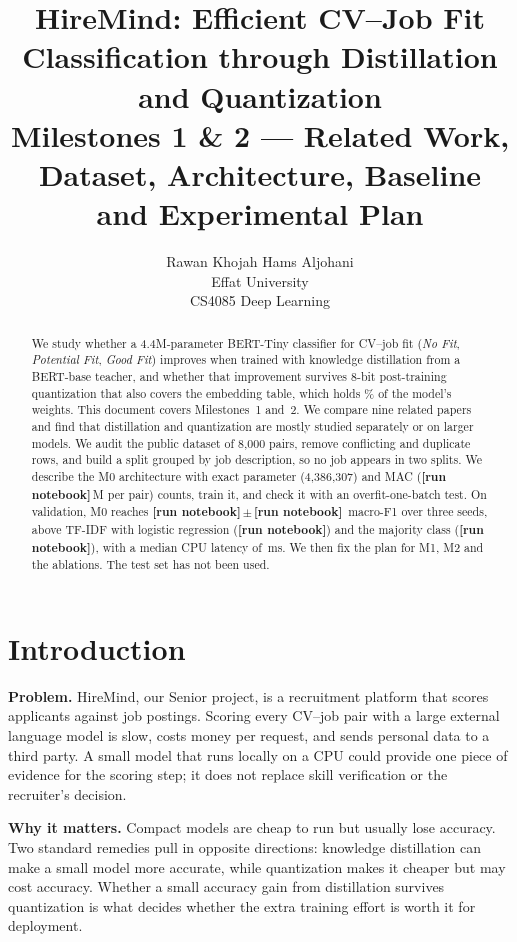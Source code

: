 \documentclass[11pt]{article}
\title{HireMind: Efficient CV--Job Fit Classification through Distillation and Quantization\\[4pt]
\large Milestones 1 \& 2 --- Related Work, Dataset, Architecture, Baseline and Experimental Plan}
\author{Rawan Khojah \quad Hams Aljohani\\Effat University\\CS4085 Deep Learning}
\newcommand{\RUN}{\textbf{[run notebook]}}
\newcommand{\MajFone}{\RUN}\newcommand{\MajAcc}{\RUN}\newcommand{\TfidfFone}{\RUN}\newcommand{\TfidfAcc}{\RUN}
\newcommand{\MzeroFoneMean}{\RUN}\newcommand{\MzeroFoneSD}{\RUN}\newcommand{\MzeroAccMean}{\RUN}\newcommand{\MzeroAccSD}{\RUN}
\newcommand{\MzeroParams}{4,386,307}\newcommand{\MzeroParamsM}{4.39}
\newcommand{\MzeroMACsM}{\RUN}\newcommand{\MzeroLayerMACsM}{\RUN}\newcommand{\MzeroMACsAnalyticM}{134.2}
\begin{document}
\maketitle

\begin{abstract}
We study whether a 4.4M-parameter BERT-Tiny classifier for CV--job fit (\emph{No Fit}, \emph{Potential Fit}, \emph{Good Fit}) improves when trained with knowledge distillation from a BERT-base teacher, and whether that improvement survives 8-bit post-training quantization that also covers the embedding table, which holds \MzeroEmbShare\% of the model's weights. This document covers Milestones~1 and~2. We compare nine related papers and find that distillation and quantization are mostly studied separately or on larger models. We audit the public dataset of 8,000 pairs, remove conflicting and duplicate rows, and build a split grouped by job description, so no job appears in two splits. We describe the M0 architecture with exact parameter (\MzeroParams) and MAC (\MzeroMACsM\,M per pair) counts, train it, and check it with an overfit-one-batch test. On validation, M0 reaches \MzeroFoneMean\,$\pm$\,\MzeroFoneSD\ macro-F1 over three seeds, above TF-IDF with logistic regression (\TfidfFone) and the majority class (\MajFone), with a median CPU latency of \MzeroLatMed\,ms. We then fix the plan for M1, M2 and the ablations. The test set has not been used.
\end{abstract}

\section{Introduction}
\textbf{Problem.} HireMind, our Senior project, is a recruitment platform that scores applicants against job postings. Scoring every CV--job pair with a large external language model is slow, costs money per request, and sends personal data to a third party. A small model that runs locally on a CPU could provide one piece of evidence for the scoring step; it does not replace skill verification or the recruiter's decision.

\textbf{Why it matters.} Compact models are cheap to run but usually lose accuracy. Two standard remedies pull in opposite directions: knowledge distillation can make a small model more accurate, while quantization makes it cheaper but may cost accuracy. Whether a small accuracy gain from distillation survives quantization is what decides whether the extra training effort is worth it for deployment.
\end{document}
